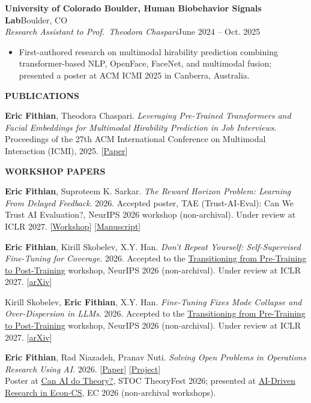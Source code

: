 \documentclass[11pt,letterpaper]{article}
\newcommand{\resumesection}[1]{%
  \par\addvspace{1.25ex}\Needspace{4\baselineskip}%
  {\bfseries #1}\par\nobreak\vspace{0.6ex}%
}
\newcommand{\paper}[1]{%
  \begin{minipage}{\linewidth}#1\end{minipage}\par\vspace{0.65em}%
}
\begin{document}
\vspace{0.4em}
\textbf{University of Colorado Boulder, Human Biobehavior Signals Lab}\hfill Boulder, CO\\
\textit{Research Assistant to Prof.~Theodora Chaspari}\hfill June 2024 -- Oct. 2025
\begin{itemize}
  \item First-authored research on multimodal hirability prediction combining transformer-based NLP, OpenFace, FaceNet, and multimodal fusion; presented a poster at ACM ICMI 2025 in Canberra, Australia.
\end{itemize}

\resumesection{PUBLICATIONS}
\paper{\textbf{Eric Fithian}, Theodora Chaspari. \textit{Leveraging Pre-Trained Transformers and Facial Embeddings for Multimodal Hirability Prediction in Job Interviews}. Proceedings of the 27th ACM International Conference on Multimodal Interaction (ICMI), 2025. [\href{https://doi.org/10.1145/3716553.3750757}{Paper}]}

\resumesection{WORKSHOP PAPERS}
\paper{\textbf{Eric Fithian}, Suproteem K. Sarkar. \textit{The Reward Horizon Problem: Learning From Delayed Feedback}. 2026. Accepted poster, TAE (Trust-AI-Eval): Can We Trust AI Evaluation?, NeurIPS 2026 workshop (non-archival). Under review at ICLR 2027. [\href{https://tai-eval.github.io/}{Workshop}] [\href{https://ericfithian.com/papers/The_Reward_Horizon_Problem.pdf}{Manuscript}]}

\paper{\textbf{Eric Fithian}, Kirill Skobelev, X.Y. Han. \textit{Don't Repeat Yourself: Self-Supervised Fine-Tuning for Coverage}. 2026. Accepted to the \href{https://pretrain2posttrain.github.io/}{Transitioning from Pre-Training to Post-Training} workshop, NeurIPS 2026 (non-archival). Under review at ICLR 2027. [\href{https://arxiv.org/abs/2609.31688}{arXiv}]}

\paper{Kirill Skobelev, \textbf{Eric Fithian}, X.Y. Han. \textit{Fine-Tuning Fixes Mode Collapse and Over-Dispersion in LLMs}. 2026. Accepted to the \href{https://pretrain2posttrain.github.io/}{Transitioning from Pre-Training to Post-Training} workshop, NeurIPS 2026 (non-archival). Under review at ICLR 2027. [\href{https://arxiv.org/abs/2609.16454}{arXiv}]}

\paper{\textbf{Eric Fithian}, Rad Niazadeh, Pranav Nuti. \textit{Solving Open Problems in Operations Research Using AI}. 2026. [\href{https://ericfithian.com/papers/Solving_Open_Problems_in_Operations_Research_using_AI.pdf}{Paper}] [\href{https://pranav-nuti.github.io/open-problems-in-or/}{Project}]\\
Poster at \href{https://pritishkamath.github.io/ai-tcs-stoc-2026/}{Can AI do Theory?}, STOC TheoryFest 2026; presented at \href{https://sites.google.com/view/aieconcs26/}{AI-Driven Research in Econ-CS}, EC 2026 (non-archival workshops).}
\end{document}
